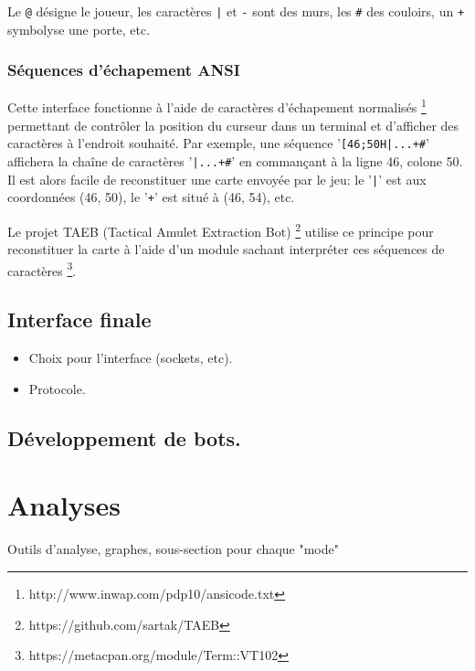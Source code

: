 \documentclass{article}
\begin{document}
Le \verb!@! désigne le joueur, les caractères \verb!|! et \verb!-! sont des murs, les \verb!#! des couloirs, un \verb!+! symbolyse une porte, etc.


\subsubsection*{Séquences d'échapement ANSI}

Cette interface fonctionne à l'aide de caractères d'échapement normalisés \footnote{http://www.inwap.com/pdp10/ansicode.txt} permettant de contrôler la position du curseur dans un terminal et d'afficher des caractères à l'endroit souhaité. Par exemple, une séquence '\verb![46;50H|...+#!' affichera la chaîne de caractères '\verb!|...+#!' en commançant à la ligne 46, colone 50. Il est alors facile de reconstituer une carte envoyée par le jeu: le '\verb!|!' est aux coordonnées (46, 50), le '\verb!+!' est situé à (46, 54), etc.
	
	Le projet TAEB (Tactical Amulet Extraction Bot) \footnote{https://github.com/sartak/TAEB} utilise ce principe pour reconstituer la carte à l'aide d'un module sachant interpréter ces séquences de caractères \footnote{https://metacpan.org/module/Term::VT102}.

\subsection{Interface finale}

\begin{itemize}
\item Choix pour l'interface (sockets, etc).
\item Protocole.
\end{itemize}

\subsection{Développement de bots.}


\section{Analyses}

Outils d'analyse, graphes, sous-section pour chaque "mode"
\end{document}
